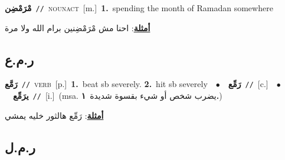 \documentclass[10pt,a4paper,twoside]{article} %
\begin{document}
\begin{multicols}{2}
{\setlength\topsep{0pt}\textbf{\foreignlanguage{arabic}{مْرَمْضِن}}\ {\color{gray}\texttt{//}\color{black}}\ \textsc{noun\textunderscore act}\ [m.]\ \textbf{1.}~spending the month of Ramadan somewhere\  \begin{flushright}\color{gray}\foreignlanguage{arabic}{\textbf{\underline{\foreignlanguage{arabic}{أمثلة}}}: احنا مش مْرَمْضِنين برام الله ولا مرة}\end{flushright}\color{black}} \vspace{2mm}

\vspace{-3mm}
\subsection*{\color{blue}\foreignlanguage{arabic}{ر.م.ع}\color{blue}{}} 

{\setlength\topsep{0pt}\textbf{\foreignlanguage{arabic}{رَمَّع}}\ {\color{gray}\texttt{//}\color{black}}\ \textsc{verb}\ [p.]\ \textbf{1.}~beat sb severely.  \textbf{2.}~hit sb severely\ \ $\bullet$\ \ \setlength\topsep{0pt}\textbf{\foreignlanguage{arabic}{رَمِّع}}\ {\color{gray}\texttt{//}\color{black}}\ [c.]\ \ $\bullet$\ \ \setlength\topsep{0pt}\textbf{\foreignlanguage{arabic}{يرَمِّع}}\ {\color{gray}\texttt{//}\color{black}}\ [i.]\ \color{gray}(msa. \foreignlanguage{arabic}{يضرب شخص أو شيء بقسوة شديدة}~\foreignlanguage{arabic}{\textbf{١.}})\color{black}\  \begin{flushright}\color{gray}\foreignlanguage{arabic}{\textbf{\underline{\foreignlanguage{arabic}{أمثلة}}}: رَمِّع هالثور خليه يمشي}\end{flushright}\color{black}} \vspace{2mm}

\vspace{-3mm}
\subsection*{\color{blue}\foreignlanguage{arabic}{ر.م.ل}\color{blue}{}} 


\end{multicols}
\end{document}

